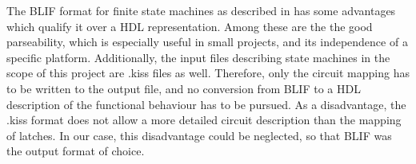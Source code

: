 The BLIF format for finite state machines as described in \cite{blif} has some advantages which qualify it over a HDL representation.
Among these are the the good parseability, which is especially useful in small projects, and its independence of a specific platform.
Additionally, the input files describing state machines in the scope of this project are .kiss files as well. Therefore, only the 
circuit mapping has to be written to the output file, and no conversion from BLIF to a HDL description of the functional behaviour has
to be pursued. As a disadvantage, the .kiss format does not allow a more detailed circuit description than the mapping of latches. 
In our case, this disadvantage could be neglected, so that BLIF was the output format of choice.




